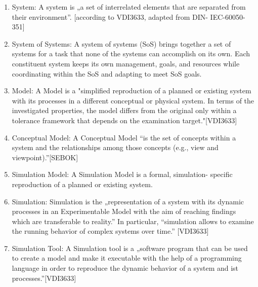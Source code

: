 

\begin{enumerate}

\item System: A system is „a set of interrelated elements that are separated from their environment”. [according to VDI3633, adapted from DIN- IEC-60050-351]  

\item System of Systems: A system of systems (SoS) brings together a set of systems for a task that none of the systems can accomplish on its own. Each constituent system keeps its own management, goals, and resources while coordinating within the SoS and adapting to meet SoS goals.

\item Model: A Model is a "simplified reproduction of a planned or existing system with its processes in a different conceptual or physical system. In terms of the investigated properties, the model differs from the original only within a tolerance framework that depends on the examination target."[VDI3633]

\item Conceptual Model: A Conceptual Model “is the set of concepts within a system and the relationships among those concepts (e.g., view and viewpoint).”[SEBOK]

\item Simulation Model: A Simulation Model is a formal, simulation- specific reproduction of a planned or existing system.

\item Simulation: Simulation is the „representation of a system with its dynamic processes in an Experimentable Model with the aim of reaching findings which are transferable to reality.” In particular, “simulation allows to examine the running behavior of complex systems over time.” [VDI3633]

\item Simulation Tool: A Simulation tool is a „software program that can be used to create a model and make it executable with the help of a programming language in order to reproduce the dynamic behavior of a system and ist processes.”[VDI3633]


\end{enumerate}
